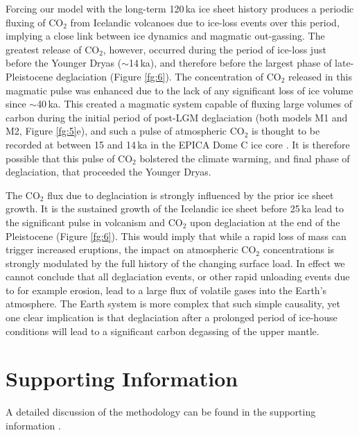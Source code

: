 \documentclass[draft,linenumbers]{agujournal2018}
\begin{document}
Forcing our model with the long-term 120\,ka ice sheet history produces a periodic fluxing of CO$_{2}$ from Icelandic volcanoes due to ice-loss events over this period, implying a close link between ice dynamics and magmatic out-gassing. The greatest release of CO$_{2}$, however, occurred during the period of ice-loss just before the Younger Dryas ($\sim$14\,ka), and therefore before the largest phase of late-Pleistocene deglaciation (Figure \ref{fg:6}). The concentration of CO$_{2}$ released in this magmatic pulse was enhanced due to the lack of any significant loss of ice volume since $\sim$40\,ka. This created a magmatic system capable of fluxing large volumes of carbon during the initial period of post-LGM deglaciation (both models M1 and M2, Figure \ref{fg:5}e), and such a pulse of atmospheric CO$_{2}$ is thought to be recorded at between 15 and 14\,ka in the EPICA Dome C ice core \citep{kohler-etal-2011}. It is therefore possible that this pulse of CO$_{2}$ bolstered the climate warming, and final phase of deglaciation, that proceeded the Younger Dryas.

The CO$_{2}$ flux due to deglaciation is strongly influenced by the prior ice sheet growth. It is the sustained growth of the Icelandic ice sheet before 25\,ka lead to the significant pulse in volcanism and CO$_{2}$ upon deglaciation at the end of the Pleistocene (Figure \ref{fg:6}). This would imply that while a rapid loss of mass can trigger increased eruptions, the impact on atmospheric CO$_{2}$ concentrations is strongly modulated by the full history of the changing surface load. In effect we cannot conclude that all deglaciation events, or other rapid unloading events due to for example erosion, lead to a large flux of volatile gases into the Earth’s atmosphere. The Earth system is more complex that such simple causality, yet one clear implication is that deglaciation after a prolonged period of ice-house conditions will lead to a significant carbon degassing of the upper mantle.

\section*{Supporting Information}

A detailed discussion of the methodology can be found in the supporting information \citep{andersen-etal-2004,andrews-2008,armitage-etal-g3-2011,clark-etal-2009,geirsdottir-2011,gibson-2010,gurenko-1995,katz-etal-2003,lambeck-2001,lambeck-etal-2014,mckenzie-1991,miller-etal-2014,ribe-1985,scott-1992,shorttle-2011,silbeck-1975,sleep-1976,spiegelman-1996,spratt-2016}.
\end{document}
